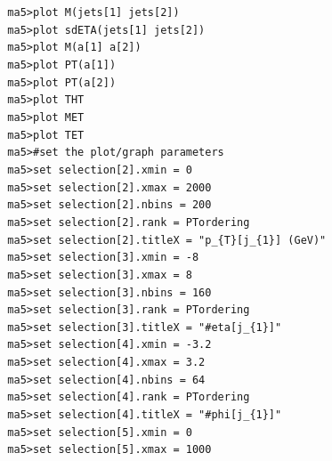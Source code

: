 \documentclass[a4paper, 10pt]{article}
\begin{document}
\texttt{ }\texttt{ }\texttt{ma5>plot M(jets[1] jets[2])\\
}
\texttt{ }\texttt{ }\texttt{ma5>plot sdETA(jets[1] jets[2])\\
}
\texttt{ }\texttt{ }\texttt{ma5>plot M(a[1] a[2])\\
}
\texttt{ }\texttt{ }\texttt{ma5>plot PT(a[1])\\
}
\texttt{ }\texttt{ }\texttt{ma5>plot PT(a[2])\\
}
\texttt{ }\texttt{ }\texttt{ma5>plot THT\\
}
\texttt{ }\texttt{ }\texttt{ma5>plot MET\\
}
\texttt{ }\texttt{ }\texttt{ma5>plot TET\\
}
\texttt{ }\texttt{ }\texttt{ma5>\#set the plot/\-graph parameters\\
}
\texttt{ }\texttt{ }\texttt{ma5>set selection[2].xmin = 0\\
}
\texttt{ }\texttt{ }\texttt{ma5>set selection[2].xmax = 2000\\
}
\texttt{ }\texttt{ }\texttt{ma5>set selection[2].nbins = 200\\
}
\texttt{ }\texttt{ }\texttt{ma5>set selection[2].rank = PTordering\\
}
\texttt{ }\texttt{ }\texttt{ma5>set selection[2].titleX = "p\_\{T\}[j\_\{1\}] (GeV)"\\
}
\texttt{ }\texttt{ }\texttt{ma5>set selection[3].xmin = -8\\
}
\texttt{ }\texttt{ }\texttt{ma5>set selection[3].xmax = 8\\
}
\texttt{ }\texttt{ }\texttt{ma5>set selection[3].nbins = 160\\
}
\texttt{ }\texttt{ }\texttt{ma5>set selection[3].rank = PTordering\\
}
\texttt{ }\texttt{ }\texttt{ma5>set selection[3].titleX = "\#eta[j\_\{1\}]"\\
}
\texttt{ }\texttt{ }\texttt{ma5>set selection[4].xmin = -3.2\\
}
\texttt{ }\texttt{ }\texttt{ma5>set selection[4].xmax = 3.2\\
}
\texttt{ }\texttt{ }\texttt{ma5>set selection[4].nbins = 64\\
}
\texttt{ }\texttt{ }\texttt{ma5>set selection[4].rank = PTordering\\
}
\texttt{ }\texttt{ }\texttt{ma5>set selection[4].titleX = "\#phi[j\_\{1\}]"\\
}
\texttt{ }\texttt{ }\texttt{ma5>set selection[5].xmin = 0\\
}
\texttt{ }\texttt{ }\texttt{ma5>set selection[5].xmax = 1000\\
}
\end{document}
